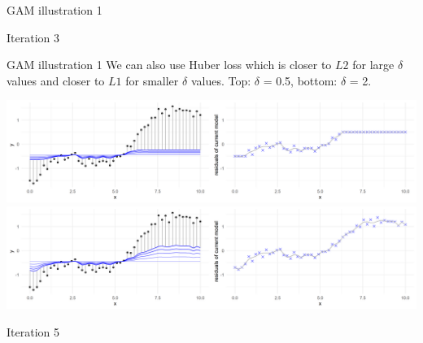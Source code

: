 \begin{frame}{GAM illustration 1}
{\vfill

Iteration 3
}

\end{frame}


\begin{frame}{GAM illustration 1}
We can also use Huber loss which is closer to $L2$ for large $\delta$ values and closer to $L1$ for 
smaller $\delta$ values. Top: $\delta$ = 0.5, bottom: $\delta$ = 2.

\vfill

\includegraphics[width=\textwidth]{figure/illustration_gaussian_huber_05_5.png}
\includegraphics[width=\textwidth]{figure/illustration_gaussian_huber_2_5.png}

\vfill

Iteration 5

\end{frame}

